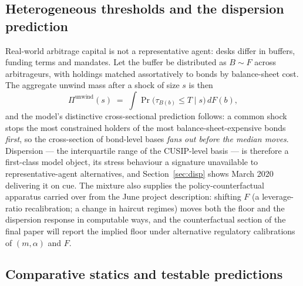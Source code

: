 \documentclass[11pt]{article}
\begin{document}
\subsection{Heterogeneous thresholds and the dispersion prediction}

Real-world arbitrage capital is not a representative agent: desks differ in buffers, funding terms and mandates. Let the buffer be distributed as $B\sim F$ across arbitrageurs, with holdings matched assortatively to bonds by balance-sheet cost. The aggregate unwind mass after a shock of size $s$ is then
\begin{equation}
\Pi^{\text{unwind}}(s) \;=\; \int \Pr\!\big(\tau_{B(b)}\le T \mid s\big)\, dF(b),
\label{eq:mixture}
\end{equation}
and the model's distinctive cross-sectional prediction follows: a common shock stops the most constrained holders of the most balance-sheet-expensive bonds \emph{first}, so the cross-section of bond-level bases \emph{fans out before the median moves}. Dispersion --- the interquartile range of the CUSIP-level basis --- is therefore a first-class model object, its stress behaviour a signature unavailable to representative-agent alternatives, and Section~\ref{sec:disp} shows March 2020 delivering it on cue. The mixture also supplies the policy-counterfactual apparatus carried over from the June project description: shifting $F$ (a leverage-ratio recalibration; a change in haircut regimes) moves both the floor and the dispersion response in computable ways, and the counterfactual section of the final paper will report the implied floor under alternative regulatory calibrations of $(m,\alpha)$ and $F$.

\subsection{Comparative statics and testable predictions}\label{sec:hyps}
\end{document}
